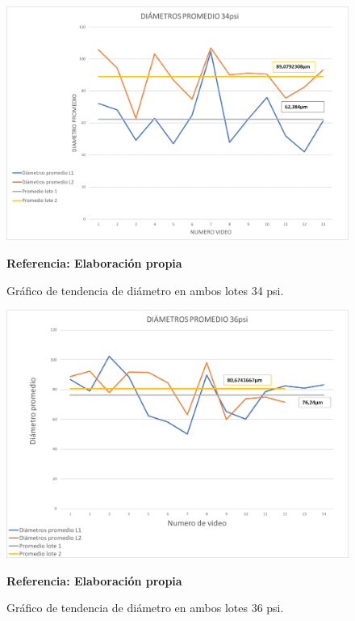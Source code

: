 \documentclass[12pt,twocolumn,a4paper]{article}
\begin{document}
\begin{figure}[h!]
	\centering
	\includegraphics[scale=0.3]{Diapro34.png}
	\caption{Gráfico de tendencia de diámetro en ambos lotes 34 psi.} \textbf{Referencia: Elaboración propia} 
	\label{diapro34}
\end{figure}

\begin{figure}[h!]
	\centering
	\includegraphics[scale=0.3]{Diapro36.png}
	\caption{Gráfico de tendencia de diámetro en ambos lotes 36 psi.} \textbf{Referencia: Elaboración propia} 
	\label{diapro36}
\end{figure}
\end{document}
